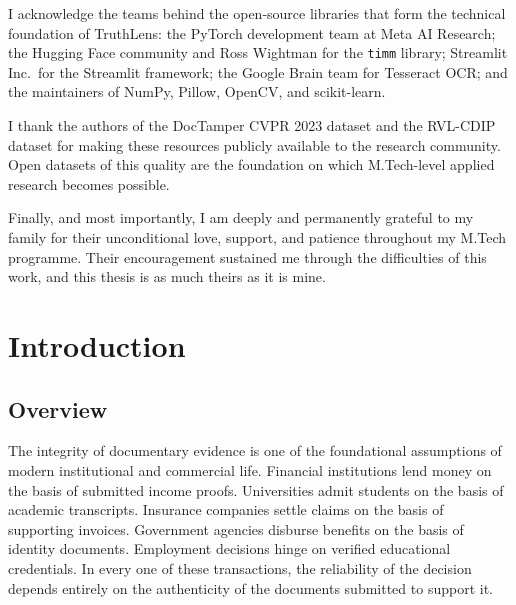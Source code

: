 \documentclass[12pt,a4paper,oneside]{report}
\begin{document}
\vspace{6pt}\noindent I acknowledge the teams behind the open-source
libraries that form the technical foundation of TruthLens: the PyTorch
development team at Meta AI Research; the Hugging Face community and Ross
Wightman for the \texttt{timm} library; Streamlit Inc.\ for the Streamlit
framework; the Google Brain team for Tesseract OCR; and the maintainers of
NumPy, Pillow, OpenCV, and scikit-learn.

\vspace{6pt}\noindent I thank the authors of the DocTamper CVPR 2023 dataset
and the RVL-CDIP dataset for making these resources publicly available to the
research community. Open datasets of this quality are the foundation on which
M.Tech-level applied research becomes possible.

\vspace{6pt}\noindent Finally, and most importantly, I am deeply and
permanently grateful to my family for their unconditional love, support, and
patience throughout my M.Tech programme. Their encouragement sustained me
through the difficulties of this work, and this thesis is as much theirs
as it is mine.

\newpage
{}\setcounter{page}{1}
\tableofcontents
\newpage\listoffigures
\newpage\listoftables
\newpage
{}\setcounter{page}{1}

\chapter{Introduction}
\label{chap:introduction}

\section{Overview}

The integrity of documentary evidence is one of the foundational assumptions
of modern institutional and commercial life. Financial institutions lend money
on the basis of submitted income proofs. Universities admit students on the
basis of academic transcripts. Insurance companies settle claims on the basis
of supporting invoices. Government agencies disburse benefits on the basis of
identity documents. Employment decisions hinge on verified educational
credentials. In every one of these transactions, the reliability of the
decision depends entirely on the authenticity of the documents submitted to
support it.
\end{document}

